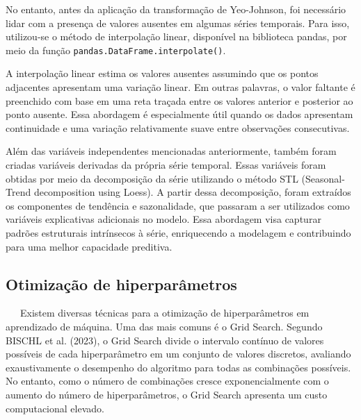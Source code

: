 \documentclass[
  12pt,
  a4paper,
]{scrreprt}
\begin{document}
\vspace{12pt}

No entanto, antes da aplicação da transformação de Yeo-Johnson, foi
necessário lidar com a presença de valores ausentes em algumas séries
temporais. Para isso, utilizou-se o método de interpolação linear,
disponível na biblioteca pandas, por meio da função
\texttt{pandas.DataFrame.interpolate()}.

\vspace{12pt}

A interpolação linear estima os valores ausentes assumindo que os pontos
adjacentes apresentam uma variação linear. Em outras palavras, o valor
faltante é preenchido com base em uma reta traçada entre os valores
anterior e posterior ao ponto ausente. Essa abordagem é especialmente
útil quando os dados apresentam continuidade e uma variação
relativamente suave entre observações consecutivas.

\vspace{12pt}

Além das variáveis independentes mencionadas anteriormente, também foram
criadas variáveis derivadas da própria série temporal. Essas variáveis
foram obtidas por meio da decomposição da série utilizando o método STL
(Seasonal-Trend decomposition using Loess). A partir dessa decomposição,
foram extraídos os componentes de tendência e sazonalidade, que passaram
a ser utilizados como variáveis explicativas adicionais no modelo. Essa
abordagem visa capturar padrões estruturais intrínsecos à série,
enriquecendo a modelagem e contribuindo para uma melhor capacidade
preditiva.

\subsection{Otimização de
hiperparâmetros}\label{otimizauxe7uxe3o-de-hiperparuxe2metros}

~~~Existem diversas técnicas para a otimização de hiperparâmetros em
aprendizado de máquina. Uma das mais comuns é o Grid Search. Segundo
BISCHL et al. (2023), o Grid Search divide o intervalo contínuo de
valores possíveis de cada hiperparâmetro em um conjunto de valores
discretos, avaliando exaustivamente o desempenho do algoritmo para todas
as combinações possíveis. No entanto, como o número de combinações
cresce exponencialmente com o aumento do número de hiperparâmetros, o
Grid Search apresenta um custo computacional elevado.

\vspace{12pt}
\end{document}
